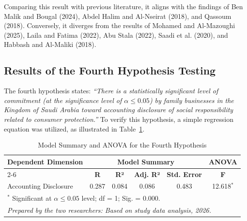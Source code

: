 \documentclass[10pt]{NSP1}
\begin{document}
	Comparing this result with previous literature, it aligns with the findings of Ben Malik and Bougal (2024), Abdel Halim and Al-Nseirat (2018), and Qassoum (2018). Conversely, it diverges from the results of Mohamed and Al-Mazoughi (2025), Laila and Fatima (2022), Abu Stala (2022), Saadi et al. (2020), and Habbash and Al-Maliki (2018).
	
	\subsection{Results of the Fourth Hypothesis Testing}
	
	The fourth hypothesis states: \emph{``There is a statistically significant level of commitment (at the significance level of \(\alpha \leq 0.05\)) by family businesses in the Kingdom of Saudi Arabia toward accounting disclosure of social responsibility related to consumer protection.''} To verify this hypothesis, a simple regression equation was utilized, as illustrated in Table~\ref{tab:h4}.
	
	\begin{table}[H]
		\centering
		\caption{Model Summary and ANOVA for the Fourth Hypothesis}
		\label{tab:h4}
		\vspace{5pt}
		\small
		\begin{tabular}{lccccc}
			\hline
			\multirow{2}{*}{\textbf{Dependent Dimension}} & \multicolumn{4}{c}{\textbf{Model Summary}} & \multicolumn{1}{c}{\textbf{ANOVA}} \\
			\cline{2-6}
			& \textbf{R} & \textbf{R²} & \textbf{Adj. R²} & \textbf{Std. Error} & \textbf{F} \\
			\hline
			Accounting Disclosure & 0.287 & 0.084 & 0.086 & 0.483 & 12.618\(^{*}\) \\
			\hline
			\multicolumn{6}{l}{\footnotesize \(^{*}\) Significant at \(\alpha \leq 0.05\) level; df = 1; Sig. = 0.000.} \\
			\multicolumn{6}{l}{\footnotesize \textit{Prepared by the two researchers: Based on study data analysis, 2026.}} \\
		\end{tabular}
	\end{table}
	
\end{document}
